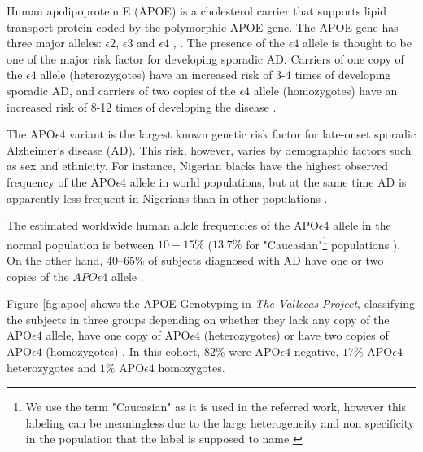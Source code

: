 \documentclass[11pt]{article}
\theoremstyle{definition}
\theoremstyle{remark}
\begin{document}
Human apolipoprotein E (APOE) is a cholesterol carrier that supports lipid transport protein coded by the polymorphic APOE gene. The APOE gene has three major alleles: $\epsilon2$, $\epsilon3$ and $\epsilon4$ \cite{mahley2000apolipoprotein}, \cite{hauser2011apolipoprotein}. The presence of the $\epsilon4$ allele is thought to be one of the major risk factor for developing sporadic AD. Carriers of one copy of the  $\epsilon4$ allele (heterozygotes) have an increased risk of 3-4 times of developing sporadic AD, and carriers of two copies of the $\epsilon4$ allele (homozygotes) have an increased risk of 8-12 times of developing the disease \cite{heffernan2016neurobiology}. 

The APO$\epsilon4$ variant is the largest known genetic risk factor for late-onset sporadic Alzheimer's disease (AD). This risk, however, varies by demographic factors such as sex and ethnicity. For instance, Nigerian blacks have the highest observed frequency of the APO$\epsilon4$ allele in world populations, but at the same time AD is apparently less frequent in Nigerians than in other populations \cite{sepehrnia1989genetic}.

The estimated worldwide human allele frequencies of the APO$\epsilon4$ allele in the normal population is between $10-15\%$\cite{myers1996apolipoprotein} ($13.7\%$ for "Caucasian"\footnote{We use the term "Caucasian" as it is used in the referred work, however this labeling can be meaningless due to the large heterogeneity and non specificity in the population that the label is supposed to name \cite{bhopal1998white}} populations \cite{corder1994protective}). 
On the other hand, $40–65\%$ of subjects diagnosed with AD have one or two copies of the $APO\epsilon4$ allele \cite{saunders1993association}. 

Figure \ref{fig:apoe} shows the APOE Genotyping in \emph{The Vallecas Project}, classifying the subjects in three groups depending on whether they lack any copy of the APO$\epsilon4$ allele, have one copy of APO$\epsilon4$ (heterozygotes) or have two copies of APO$\epsilon4$ (homozygotes) \cite{farrer1997effects}. In this cohort, $82\%$ were APO$\epsilon4$ negative, $17\%$ APO$\epsilon4$ heterozygotes and $1\%$ APO$\epsilon4$ homozygotes. 
\end{document}
